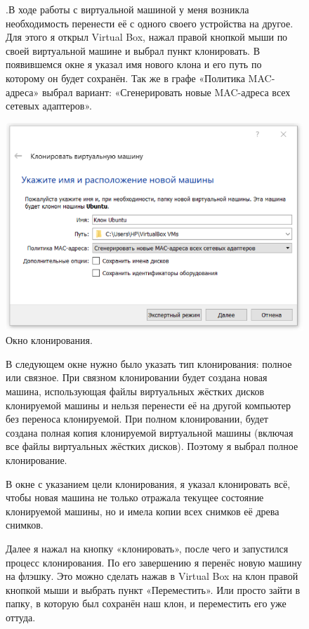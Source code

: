 \documentclass[oneside,final,12pt]{extarticle} %
\begin{document}
\begin{figure}
.\quad В ходе работы с виртуальной машиной у меня возникла необходимость перенести её с одного своего устройства на другое.
\newline Для этого я открыл Virtual Box, нажал правой кнопкой мыши по своей виртуальной машине и выбрал пункт клонировать. В появившемся окне я указал имя нового клона и его путь по которому он будет сохранён. Так же в графе «Политика MAC-адреса» выбрал вариант: «Сгенерировать новые MAC-адреса всех сетевых адаптеров».
		
		\centering
		\includegraphics[width=0.6\linewidth]{img/8.png}
\caption{Окно клонирования.}
\label{ris:image}
\end{figure}

\begin{figure}
\quad В следующем окне нужно было указать тип клонирования: полное или связное. При связном клонировании будет создана новая машина, использующая файлы виртуальных жёстких дисков клонируемой машины и нельзя перенести её на другой компьютер без переноса клонируемой. При полном клонировании, будет создана полная копия клонируемой виртуальной машины (включая все файлы виртуальных жёстких дисков). Поэтому я выбрал полное клонирование.
\end{figure}

\begin{figure}
\quad В окне с указанием цели клонирования, я указал клонировать всё, чтобы новая машина не только отражала текущее состояние клонируемой машины, но и имела копии всех снимков её древа снимков.
\end{figure}

\begin{figure}
\quad Далее я нажал на кнопку «клонировать», после чего и запустился процесс клонирования. По его завершению я перенёс новую машину на флэшку. Это можно сделать нажав в Virtual Box на клон правой кнопкой мыши и выбрать пункт «Переместить». Или просто зайти в папку, в которую был сохранён наш клон, и переместить его уже оттуда.
\end{figure}
\end{document}
